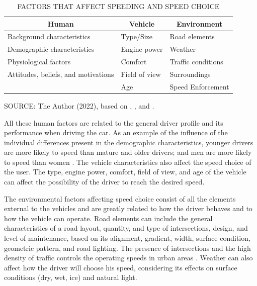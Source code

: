 \begin{table}[!hbtp]
    \footnotesize
    \captionsetup{justification=raggedright,
        singlelinecheck=false,
        font=footnotesize}
    \caption{FACTORS THAT AFFECT SPEEDING AND SPEED CHOICE}
    \centering
    \begin{tabular}{lll}
    \hline
    \multicolumn{1}{c}{\textbf{Human}}                  & \multicolumn{1}{c}{\textbf{Vehicle}} & \multicolumn{1}{c}{\textbf{Environment}} \\ \hline
    Background characteristics      & Type/Size        & Road elements        \\
    Demographic characteristics     & Engine power     & Weather              \\
    Physiological factors           & Comfort          & Traffic conditions   \\
    Attitudes, beliefs, and motivations & Field of view    & Surroundings    \\
                                    & Age              & Speed Enforcement    \\ \hline
\end{tabular}
    \label{tab:spdfct}
    \par \vspace{2mm} \footnotesize \raggedright
    SOURCE: The Author (2022), based on \textcite{Richard2013a}, \textcite{Shinar2017}, and \textcite{WHO2008}.
\end{table}

All these human factors are related to the general driver profile and its performance when driving the car. As an example of the influence of the individual differences present in the demographic characteristics, younger drivers are more likely to speed than mature and older drivers; and men are more likely to speed than women \cite{Shinar2017}. The vehicle characteristics also affect the speed choice of the user. The type, engine power, comfort, field of view, and age of the vehicle can affect the possibility of the driver to reach the desired speed. 

The environmental factors affecting speed choice consist of all the elements external to the vehicles and are greatly related to how the driver behaves and to how the vehicle can operate. Road elements can include the general characteristics of a road layout, quantity, and type of intersections, design, and level of maintenance, based on its alignment, gradient, width, surface condition, geometric pattern, and road lighting. The presence of intersections and the high density of traffic controls the operating speeds in urban areas \cite{Mohan2016a}. Weather can also affect how the driver will choose his speed, considering its effects on surface conditions (dry, wet, ice) and natural light.  

